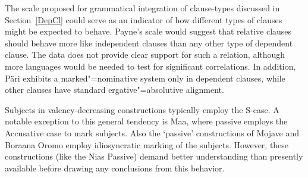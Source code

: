 The scale proposed for grammatical integration of clause-types \citep{Payne:1997} discussed in Section~\ref{DepCl} could serve as an indicator of how different types of clauses might be expected to behave.  
Payne's scale would suggest that relative clauses should behave more like independent clauses than any other type of dependent clause. 
The data does not provide clear support for such a relation, although more languages would be needed to test for significant correlations. 
In addition, P\"ari exhibits a marked"=nominative system only in dependent clauses, while other clauses have standard ergative"=absolutive alignment. 

Subjects in valency-decreasing %
constructions typically employ the S-case. 
A notable exception to this general tendency is Maa, where passive %
employs the Accusative case to mark subjects. 
Also the `passive' constructions of Mojave and Boraana Oromo employ idiosyncratic marking of the subjects. \enlargethispage{\baselineskip}
However, these constructions (like the Nias Passive) demand better understanding than presently available before drawing any conclusions from this behavior.

		


